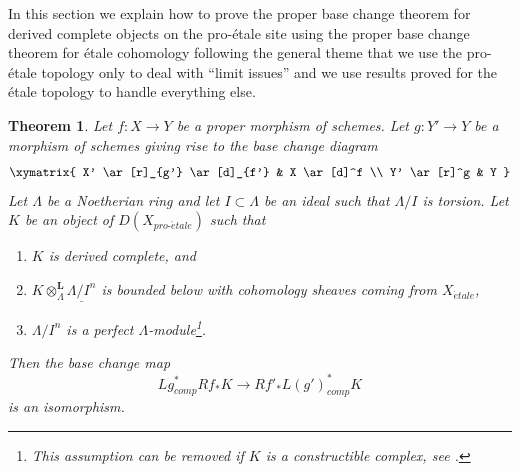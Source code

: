 \documentclass[10pt,a4paper]{article}
\theoremstyle{plain}
\newtheorem{theorem}[subsection]{Theorem}
\theoremstyle{definition}
\theoremstyle{remark}
\numberwithin{equation}{subsection}
\def\proetale{{pro\text{-}\acute{e}tale}}
\def\etale{{\acute{e}tale}}
\begin{document}
\noindent
In this section we explain how to prove the proper base change theorem
for derived complete objects on the pro-\'etale site using the proper
base change theorem for \'etale cohomology following the general theme
that we use the pro-\'etale topology only to deal with ``limit issues''
and we use results proved for the \'etale topology to handle everything
else.


\begin{theorem}
\label{theorem-proper-base-change}
Let $f : X \to Y$ be a proper morphism of schemes. Let $g : Y' \to Y$ be
a morphism of schemes giving rise to the base change diagram
$$
\xymatrix{
X' \ar[r]_{g'} \ar[d]_{f'} & X \ar[d]^f \\
Y' \ar[r]^g & Y
}
$$
Let $\Lambda$ be a Noetherian ring and let $I \subset \Lambda$ be an ideal
such that $\Lambda/I$ is torsion. Let $K$ be an object
of $D(X_\proetale)$ such that
\begin{enumerate}
\item $K$ is derived complete, and
\item $K \otimes_\Lambda^\mathbf{L} \underline{\Lambda/I^n}$ is
bounded below with cohomology sheaves coming from $X_\etale$,
\item $\Lambda/I^n$ is a perfect $\Lambda$-module\footnote{This assumption
can be removed if $K$ is a constructible complex, see \cite{BS}.}.
\end{enumerate}
Then the base change map
$$
Lg_{comp}^*Rf_*K \longrightarrow Rf'_*L(g')^*_{comp}K
$$
is an isomorphism.
\end{theorem}
\end{document}
